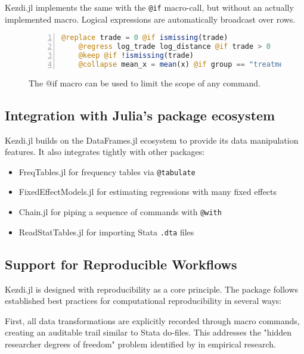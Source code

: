 \documentclass{juliacon}
\begin{document}
Kezdi.jl implements the same with the \texttt{@if} macro-call, but without an actually implemented macro. Logical expressions are automatically broadcast over rows.

\begin{figure}[t]
	\begin{lstlisting}[language = Julia, numbers=left, numberstyle=\tiny\color{gray}]
	@replace trade = 0 @if ismissing(trade)
	@regress log_trade log_distance @if trade > 0
	@keep @if !ismissing(trade) 
	@collapse mean_x = mean(x) @if group == "treatment"		
	\end{lstlisting}
	
\caption{The @if macro can be used to limit the scope of any command.}
\label{fig:ifmacro}
\end{figure}

\subsection{Integration with Julia's package ecosystem}

Kezdi.jl builds on the DataFrames.jl ecosystem \cite{DataFrame.jl2023} to provide its data manipulation features. It also integrates tightly with other packages:

\begin{itemize}
	\item FreqTables.jl \cite{FreqTables.jl2023} for frequency tables via \texttt{@tabulate}
	\item FixedEffectModels.jl \cite{FixedEffectModels.jl2023} for estimating regressions with many fixed effects
	\item Chain.jl for piping a sequence of commands with \texttt{@with}
	\item ReadStatTables.jl for importing Stata \texttt{.dta} files
\end{itemize}

\subsection{Support for Reproducible Workflows}

Kezdi.jl is designed with reproducibility as a core principle. The package follows established best practices for computational reproducibility \cite{krafczyk2021learning} in several ways:

First, all data transformations are explicitly recorded through macro commands, creating an auditable trail similar to Stata do-files. This addresses the "hidden researcher degrees of freedom" problem identified by \cite{huntington2021influence} in empirical research.
\end{document}
